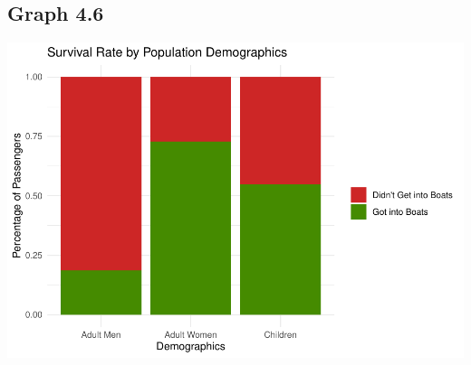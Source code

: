 \documentclass[
  11pt,
]{article}
\begin{document}
\hypertarget{graph-4.6}{%
\subsection{Graph 4.6}\label{graph-4.6}}

\includegraphics{README_files/figure-latex/unnamed-chunk-7-1.pdf}
\end{document}
